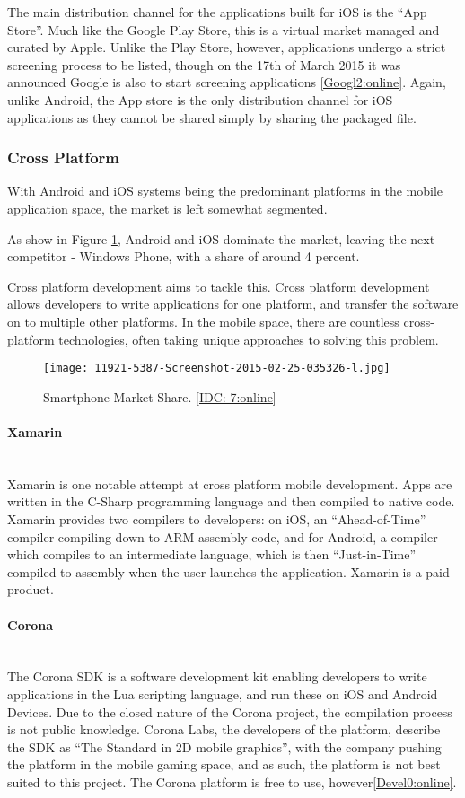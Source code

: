 \documentclass[a4paper]{article}
\newcommand{\subsubsubsection}[1]{\paragraph{#1}\mbox{}\\}
\begin{document}
The main distribution channel for the applications built for iOS is the ``App Store''. Much like the Google Play Store, this is a virtual market managed and curated by Apple. Unlike the Play Store, however, applications undergo a strict screening process to be listed, though on the 17th of March 2015 it was announced Google is also to start screening applications \ref{Googl2:online}. Again, unlike Android, the App store is the only distribution channel for iOS applications as they cannot be shared simply by sharing the packaged file. %


\subsubsection{Cross Platform}
With Android and iOS systems being the predominant platforms in the mobile application space, the market is left somewhat segmented.

As show in Figure \ref{fig:marketShare}, Android and iOS dominate the market, leaving the next competitor - Windows Phone, with a share of around 4 percent. 

Cross platform development aims to tackle this. Cross platform development allows developers to write applications for one platform, and transfer the software on to multiple other platforms.
In the mobile space, there are countless cross-platform technologies, often taking unique approaches to solving this problem.
\begin{figure}[H]
  \centering
    \texttt{[image: 11921-5387-Screenshot-2015-02-25-035326-l.jpg]}
     \caption{Smartphone Market Share. \ref{IDC: 7:online}}
      \label{fig:marketShare} %
\end{figure}
\subsubsubsection{Xamarin} 
Xamarin is one notable attempt at cross platform mobile development. Apps are written in the C-Sharp programming language and then compiled to native code. Xamarin provides two compilers to developers: on iOS, an ``Ahead-of-Time'' compiler compiling down to ARM assembly code, and for Android, a compiler which compiles to an intermediate language, which is then ``Just-in-Time'' compiled to assembly when the user launches the application.
Xamarin is a paid product.

\subsubsubsection{Corona} 
The Corona SDK is a software development kit enabling developers to write applications in the Lua scripting language, and run these on iOS and Android Devices. Due to the closed nature of the Corona project, the compilation process is not public knowledge. Corona Labs, the developers of the platform, describe the SDK as ``The Standard in 2D mobile graphics'', with the company pushing the platform in the mobile gaming space, and as such, the platform is not best suited to this project. The Corona platform is free to use, however\ref{Devel0:online}. %
\end{document}
